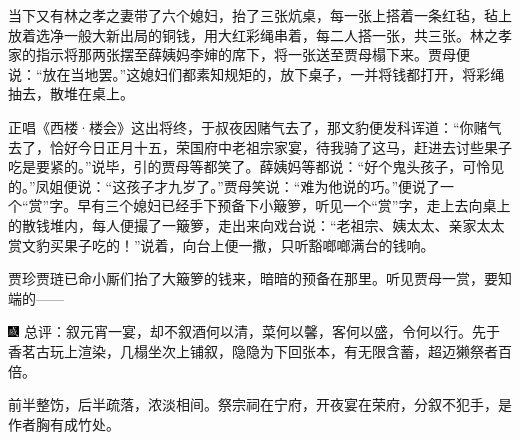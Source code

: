 当下又有林之孝之妻带了六个媳妇，抬了三张炕桌，每一张上搭着一条红毡，毡上放着选净一般大新出局的铜钱，用大红彩绳串着，每二人搭一张，共三张。林之孝家的指示将那两张摆至薛姨妈李婶的席下，将一张送至贾母榻下来。贾母便说：``放在当地罢。''这媳妇们都素知规矩的，放下桌子，一并将钱都打开，将彩绳抽去，散堆在桌上。

正唱《西楼·楼会》这出将终，于叔夜因赌气去了，那文豹便发科诨道：``你赌气去了，恰好今日正月十五，荣国府中老祖宗家宴，待我骑了这马，赶进去讨些果子吃是要紧的。''说毕，引的贾母等都笑了。薛姨妈等都说：``好个鬼头孩子，可怜见的。''凤姐便说：``这孩子才九岁了。''贾母笑说：``难为他说的巧。''便说了一个``赏''字。早有三个媳妇已经手下预备下小簸箩，听见一个``赏''字，走上去向桌上的散钱堆内，每人便撮了一簸箩，走出来向戏台说：``老祖宗、姨太太、亲家太太赏文豹买果子吃的！''说着，向台上便一撒，只听豁啷啷满台的钱响。

贾珍贾琏已命小厮们抬了大簸箩的钱来，暗暗的预备在那里。听见贾母一赏，要知端的------

{\includegraphics[width=3mm]{../Images/00005}  \kaishu 总评：叙元宵一宴，却不叙酒何以清，菜何以馨，客何以盛，令何以行。先于香茗古玩上渲染，几榻坐次上铺叙，隐隐为下回张本，有无限含蓄，超迈獭祭者百倍。}

{前半整饬，后半疏落，浓淡相间。祭宗祠在宁府，开夜宴在荣府，分叙不犯手，是作者胸有成竹处。}

